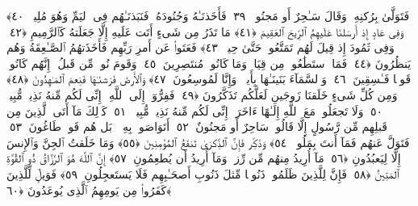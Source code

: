  فَتَوَلَّىٰ بِرُكنِهِۦ وَقَالَ سَـٰحِرٌ أَو مَجنُونٌۭ ﴿٣٩﴾
 فَأَخَذنَـٰهُ وَجُنُودَهُۥ فَنَبَذنَـٰهُم فِى ٱليَمِّ وَهُوَ مُلِيمٌۭ ﴿٤٠﴾
 وَفِى عَادٍ إِذ أَرسَلنَا عَلَيهِمُ ٱلرِّيحَ ٱلعَقِيمَ ﴿٤١﴾
 مَا تَذَرُ مِن شَىءٍ أَتَت عَلَيهِ إِلَّا جَعَلَتهُ كَٱلرَّمِيمِ ﴿٤٢﴾
 وَفِى ثَمُودَ إِذ قِيلَ لَهُم تَمَتَّعُوا۟ حَتَّىٰ حِينٍۢ ﴿٤٣﴾
 فَعَتَوا۟ عَن أَمرِ رَبِّهِم فَأَخَذَتهُمُ ٱلصَّـٰعِقَةُ وَهُم يَنظُرُونَ ﴿٤٤﴾
 فَمَا ٱستَطَٰعُوا۟ مِن قِيَامٍۢ وَمَا كَانُوا۟ مُنتَصِرِينَ ﴿٤٥﴾
 وَقَومَ نُوحٍۢ مِّن قَبلُ ۖ إِنَّهُم كَانُوا۟ قَومًۭا فَـٰسِقِينَ ﴿٤٦﴾
 وَٱلسَّمَآءَ بَنَينَـٰهَا بِأَيي۟دٍۢ وَإِنَّا لَمُوسِعُونَ ﴿٤٧﴾
 وَٱلأَرضَ فَرَشنَـٰهَا فَنِعمَ ٱلمَـٰهِدُونَ ﴿٤٨﴾
 وَمِن كُلِّ شَىءٍ خَلَقنَا زَوجَينِ لَعَلَّكُم تَذَكَّرُونَ ﴿٤٩﴾
 فَفِرُّوٓا۟ إِلَى ٱللَّهِ ۖ إِنِّى لَكُم مِّنهُ نَذِيرٌۭ مُّبِينٌۭ ﴿٥٠﴾
 وَلَا تَجعَلُوا۟ مَعَ ٱللَّهِ إِلَـٰهًا ءَاخَرَ ۖ إِنِّى لَكُم مِّنهُ نَذِيرٌۭ مُّبِينٌۭ ﴿٥١﴾
 كَذَٟلِكَ مَآ أَتَى ٱلَّذِينَ مِن قَبلِهِم مِّن رَّسُولٍ إِلَّا قَالُوا۟ سَاحِرٌ أَو مَجنُونٌ ﴿٥٢﴾
 أَتَوَاصَوا۟ بِهِۦ ۚ بَل هُم قَومٌۭ طَاغُونَ ﴿٥٣﴾
 فَتَوَلَّ عَنهُم فَمَآ أَنتَ بِمَلُومٍۢ ﴿٥٤﴾
 وَذَكِّر فَإِنَّ ٱلذِّكرَىٰ تَنفَعُ ٱلمُؤمِنِينَ ﴿٥٥﴾
 وَمَا خَلَقتُ ٱلجِنَّ وَٱلإِنسَ إِلَّا لِيَعبُدُونِ ﴿٥٦﴾
 مَآ أُرِيدُ مِنهُم مِّن رِّزقٍۢ وَمَآ أُرِيدُ أَن يُطعِمُونِ ﴿٥٧﴾
 إِنَّ ٱللَّهَ هُوَ ٱلرَّزَّاقُ ذُو ٱلقُوَّةِ ٱلمَتِينُ ﴿٥٨﴾
 فَإِنَّ لِلَّذِينَ ظَلَمُوا۟ ذَنُوبًۭا مِّثلَ ذَنُوبِ أَصحَـٰبِهِم فَلَا يَستَعجِلُونِ ﴿٥٩﴾
 فَوَيلٌۭ لِّلَّذِينَ كَفَرُوا۟ مِن يَومِهِمُ ٱلَّذِى يُوعَدُونَ ﴿٦٠﴾
 
